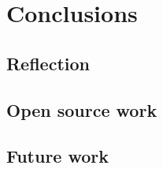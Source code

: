 \chapter{Conclusions}
\label{ch:conclusions} %



\section{Reflection}
\label{sec:reflection} %

\section{Open source work}
\label{sec:open-source-work} %

\section{Future work}
\label{sec:future-work} %

